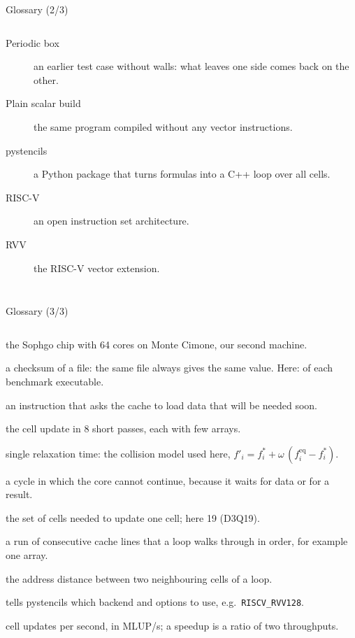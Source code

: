 \documentclass[aspectratio=169,10pt,t]{beamer}
\newcommand{\code}[1]{\texttt{#1}}
\begin{document}
\begin{frame}{Glossary (2/3)}
\begin{columns}[T,onlytextwidth]
\begin{description}
      \item[Periodic box] an earlier test case without walls: what leaves one side comes back on the other.
      \item[Plain scalar build] the same program compiled without any vector instructions.
      \item[pystencils] a Python package that turns formulas into a C++ loop over all cells.
      \item[RISC-V] an open instruction set architecture.
      \item[RVV] the RISC-V vector extension.
    \end{description}
  \end{columns}
\end{frame}

\begin{frame}{Glossary (3/3)}
  \begin{columns}[T,onlytextwidth]
    \scriptsize
    \begin{description}\setlength{\itemsep}{0pt}
      \item[SG2044] the Sophgo chip with 64 cores on Monte Cimone, our second machine.
      \item[sha256] a checksum of a file: the same file always gives the same value. Here: of each benchmark executable.
      \item[Software prefetch] an instruction that asks the cache to load data that will be needed soon.
      \item[Split loop] the cell update in 8 short passes, each with few arrays.
      \item[SRT] single relaxation time: the collision model used here, $f'_i = f^*_i + \omega\,(f^{\mathrm{eq}}_i - f^*_i)$.
      \item[Stall] a cycle in which the core cannot continue, because it waits for data or for a result.
      \item[Stencil] the set of cells needed to update one cell; here 19 (D3Q19).
      \item[Stream] a run of consecutive cache lines that a loop walks through in order, for example one array.
      \item[Stride] the address distance between two neighbouring cells of a loop.
      \item[Target] tells pystencils which backend and options to use, e.g.\ \code{RISCV\_RVV128}.
      \item[Throughput] cell updates per second, in MLUP/s; a speedup is a ratio of two throughputs.

\end{description}
\end{columns}
\end{frame}
\end{document}
